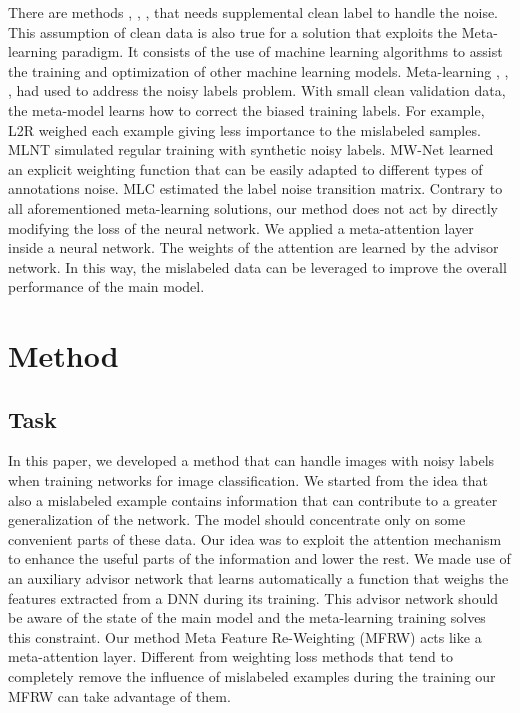 \documentclass[runningheads]{llncs}
\begin{document}
	There are methods \cite{azadi2015auxiliary}, \cite{vahdat2017toward}, \cite{veit2017learning}, \cite{li2017learning} that needs supplemental clean label to handle the noise. This assumption of clean data is also true for a solution that exploits the Meta-learning paradigm. It consists of the use of machine learning algorithms to assist the training and optimization of other machine learning models. Meta-learning \cite{ren2018learning}, \cite{shu2019meta}, \cite{li2019learning}, \cite{wang2020training} had used to address the noisy labels problem. With small clean validation data, the meta-model learns how to correct the biased training labels. For example, L2R \cite{ren2018learning} weighed each example giving less importance to the mislabeled samples. MLNT \cite{li2019learning} simulated regular training with synthetic noisy labels. MW-Net \cite{shu2019meta} learned an explicit weighting function that can be easily adapted to different types of annotations noise. MLC \cite{wang2020training} estimated the label noise transition matrix. Contrary to all aforementioned meta-learning solutions, our method does not act by directly modifying the loss of the neural network. We applied a meta-attention layer inside a neural network. The weights of the attention are learned by the advisor network. In this way, the mislabeled data can be leveraged to improve the overall performance of the main model.
	
	\section{Method}
	
	\subsection{Task}
	
	In this paper, we developed a method that can handle images with noisy labels when training networks for image classification. We started from the idea that also a mislabeled example contains information that can contribute to a greater generalization of the network. The model should concentrate only on some convenient parts of these data. Our idea was to exploit the attention mechanism to enhance the useful parts of the information and lower the rest. We made use of an auxiliary advisor network that learns automatically a function that weighs the features extracted from a DNN during its training. This advisor network should be aware of the state of the main model and the meta-learning training solves this constraint. Our method Meta Feature Re-Weighting (MFRW) acts like a meta-attention layer. Different from weighting loss methods that tend to completely remove the influence of mislabeled examples during the training our MFRW can take advantage of them.
	
\end{document}
